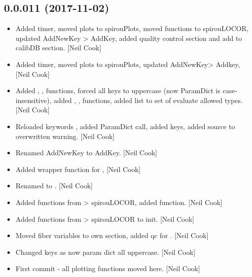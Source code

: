 \documentclass[a4paper,10pt,english]{report}
\begin{document}
\subsection{0.0.011 (2017-11-02)}
\label{\detokenize{misc/changelog:id540}}\begin{itemize}
\item {} 
Added timer, moved plots to spirouPlots, moved functions to
spirouLOCOR, updated AddNewKey \textendash{}\textgreater{} AddKey, added quality control
section and add to calibDB section. {[}Neil Cook{]}

\item {} 
Added timer, moved plots to spirouPlots, updated AddNewKey\textendash{}\textgreater{} Addkey,
{[}Neil Cook{]}

\item {} 
Added , ,  functions, forced all keys
to uppercase (now ParamDict is case-insensitive), added ,
,  functions, added list to set
of evaluate allowed types. {[}Neil Cook{]}

\item {} 
Reloaded keywords , added ParamDict call, added  keys,
added source to overwritten warning. {[}Neil Cook{]}

\item {} 
Renamed AddNewKey to AddKey. {[}Neil Cook{]}

\item {} 
Added wrapper function for  , {[}Neil Cook{]}

\item {} 
Renamed  to
. {[}Neil Cook{]}

\item {} 
Added functions from  \textendash{}\textgreater{} spirouLOCOR, added
 function. {[}Neil Cook{]}

\item {} 
Added functions from  \textendash{}\textgreater{} spirouLOCOR to init. {[}Neil Cook{]}

\item {} 
Moved fiber variables to own section, added qc for . {[}Neil
Cook{]}

\item {} 
Changed keys as now param dict all uppercase. {[}Neil Cook{]}

\item {} 
First commit - all plotting functions moved here. {[}Neil Cook{]}

\end{itemize}
\end{document}
